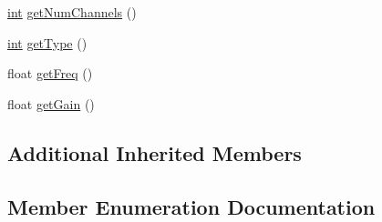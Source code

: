 \begin{DoxyCompactItemize}
\item 
\hyperlink{tk_8h_a83f82f76e7fed06f4c49d2db94028a6d}{int} \hyperlink{class_audealize_1_1_n_channel_filter_afa2ba7a3a53cb500f7263074427d63db}{get\+Num\+Channels} ()
\item 
\hyperlink{tk_8h_a83f82f76e7fed06f4c49d2db94028a6d}{int} \hyperlink{class_audealize_1_1_n_channel_filter_a1ff68a140343d7828506a920cfdf3325}{get\+Type} ()
\item 
float \hyperlink{class_audealize_1_1_n_channel_filter_a8f4d53307d5667c5c16d9d81cb3f0613}{get\+Freq} ()
\item 
float \hyperlink{class_audealize_1_1_n_channel_filter_a617f6a9421d661be1367e7a6834f3106}{get\+Gain} ()
\end{DoxyCompactItemize}
\subsection*{Additional Inherited Members}


\subsection{Member Enumeration Documentation}
